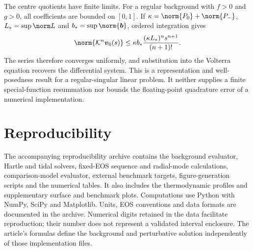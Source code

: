 The centre quotients have finite limits. For a regular background with $f>0$ and $g>0$, all coefficients are bounded on $[0,1]$. If $\kappa=\norm{P_0}+\norm{P_-}$, $L_* =\sup\norm L$ and $b_* =\sup\norm{\boldsymbol b}$, ordered integration gives
\begin{equation}
 \norm{\mathcal K^n\boldsymbol v_0(s)}
 \le\kappa b_*\frac{(\kappa L_*)^n s^{n+1}}{(n+1)!}.
\end{equation}
The series therefore converges uniformly, and substitution into the Volterra equation recovers the differential system. This is a representation and well-posedness result for a regular-singular linear problem. It neither supplies a finite special-function resummation nor bounds the floating-point quadrature error of a numerical implementation.

\section{Reproducibility}
The accompanying reproducibility archive contains the background evaluator, Hartle and tidal solvers, fixed-EOS sequence and radial-mode calculations, comparison-model evaluator, external benchmark targets, figure-generation scripts and the numerical tables. It also includes the thermodynamic profiles and supplementary surface and benchmark plots. Computations use Python with NumPy, SciPy and Matplotlib. Units, EOS conventions and data formats are documented in the archive. Numerical digits retained in the data facilitate reproduction; their number does not represent a validated interval enclosure. The article's formulas define the background and perturbative solution independently of those implementation files.
